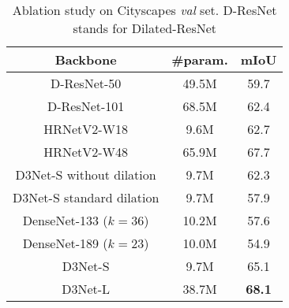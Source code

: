 \documentclass[final]{cvpr}
\begin{document}
\begin{table}[t]
\caption{\label{tab:cityscapesAbration}Ablation study on Cityscapes \textit{val} set. D-ResNet stands for Dilated-ResNet}
\small
\centering
\begin{tabular}{ c | c | c } 
\hline
Backbone &	\#param. &	mIoU  \\
\hline
D-ResNet-50 \cite{He16ResNet} &	49.5M &	59.7\\
D-ResNet-101  \cite{He16ResNet} &		68.5M &	62.4\\
HRNetV2-W18 \cite{WangSCJDZLMTWLX19} &	9.6M &	62.7\\
HRNetV2-W48 \cite{WangSCJDZLMTWLX19} &	65.9M &	67.7 \\
\hline
D3Net-S without dilation  &	9.7M &	62.3 \\
D3Net-S standard dilation  &	9.7M &	57.9 \\
DenseNet-133 ($k=36$)	&	10.2M & 57.6\\
DenseNet-189 ($k=23$) &	10.0M  &	54.9\\
\hline
D3Net-S &		9.7M  &	65.1\\
D3Net-L &	38.7M  &	\textbf{68.1}\\
\hline
\end{tabular}
\end{table}
\end{document}
